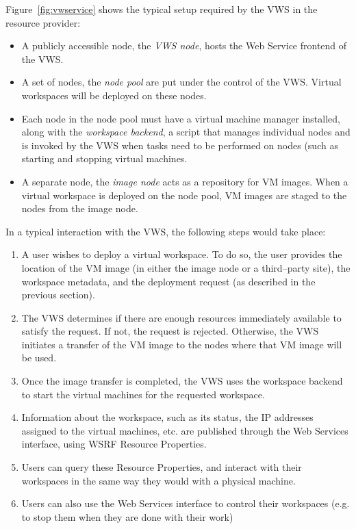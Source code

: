 Figure~\ref{fig:vwservice} shows the typical setup required by the VWS in the resource provider:

\begin{itemize}
\item A publicly accessible node, the \emph{VWS node}, hosts the Web Service frontend of the VWS.
\item A set of nodes, the \emph{node pool} are put under the control of the VWS. Virtual workspaces will be deployed on these nodes.
\item Each node in the node pool must have a virtual machine manager installed, along with the \emph{workspace backend}, a script that manages individual nodes and is invoked by the VWS when tasks need to be performed on nodes (such as starting and stopping virtual machines.
\item A separate node, the \emph{image node} acts as a repository for VM images. When a virtual workspace is deployed on the node pool, VM images are staged to the nodes from the image node.
\end{itemize}

In a typical interaction with the VWS, the following steps would take place:

\begin{enumerate}
\item A user wishes to deploy a virtual workspace. To do so, the user provides the location of the VM image (in either the image node or a third--party site), the workspace metadata, and the deployment request (as described in the previous section).
\item The VWS determines if there are enough resources immediately available to satisfy the request. If not, the request is rejected. Otherwise, the VWS initiates a transfer of the VM image to the nodes where that VM image will be used.
\item Once the image transfer is completed, the VWS uses the workspace backend to start the virtual machines for the requested workspace.
\item Information about the workspace, such as its status, the IP addresses assigned to the virtual machines, etc. are published through the Web Services interface, using WSRF Resource Properties.
\item Users can query these Resource Properties, and interact with their workspaces in the same way they would with a physical machine.
\item Users can also use the Web Services interface to control their workspaces (e.g. to stop them when they are done with their work)
\end{enumerate}

